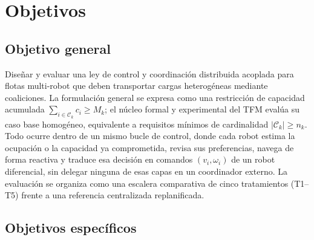 \section{Objetivos}
\label{sec:objetivos}

\subsection{Objetivo general}

Diseñar y evaluar una ley de control y coordinación distribuida acoplada para flotas multi-robot
que deben transportar cargas heterogéneas mediante coaliciones. La formulación general
se expresa como una restricción de capacidad acumulada
$\sum_{i\in\mathcal{C}_k} c_i \geq M_k$; el núcleo formal y experimental del TFM evalúa
su caso base homogéneo, equivalente a requisitos mínimos de cardinalidad
$|\mathcal{C}_k|\geq n_k$. Todo ocurre dentro de un mismo bucle de control, donde cada robot estima la
ocupación o la capacidad ya comprometida, revisa sus preferencias, navega de forma
reactiva y traduce esa decisión en comandos $(v_i,\omega_i)$ de un robot diferencial,
sin delegar ninguna de esas capas en un coordinador externo. La evaluación se organiza
como una escalera comparativa de cinco tratamientos (T1--T5) frente a una referencia
centralizada replanificada.

\subsection{Objetivos específicos}

